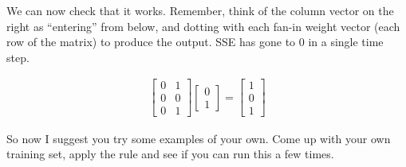 We can now check that it works. Remember, think of the column vector on the right as ``entering'' from below, and dotting with each fan-in weight vector (each row of the matrix) to produce the output.  SSE has gone to 0 in a single time step.

\begin{align*}
\begin{bmatrix} 0 & 1 \\ 0 & 0 \\  0  & 1  \end{bmatrix}
\begin{bmatrix} 0 \\ 1 \end{bmatrix}
= \begin{bmatrix} 1 \\ 0 \\ 1  \end{bmatrix}
\end{align*}

So now I suggest you try some examples of your own.  Come up with your own training set, apply the rule and see if you can run this a few times.  

